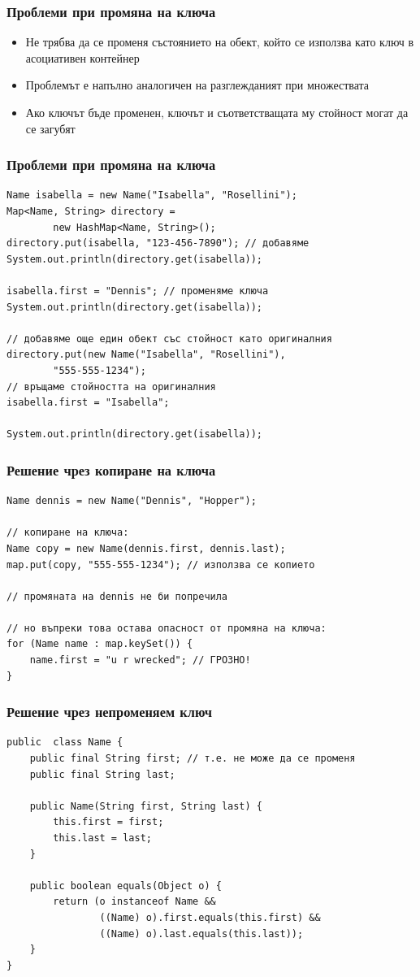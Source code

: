 \documentclass[ignorenonframetext, hyperref=unicode,compress]{beamer}
\begin{document}
\begin{frame}[containsverbatim]\frametitle{Проблеми при промяна на ключа}
\begin{itemize}
\item Не трябва да се променя състоянието на обект, който се използва като ключ в асоциативен контейнер
\item Проблемът е напълно аналогичен на разглежданият при множествата
\item Ако ключът бъде променен, ключът и съответстващата му стойност могат да се загубят
\end{itemize}
\end{frame}

\begin{frame}[containsverbatim]\frametitle{Проблеми при промяна на ключа}
\begin{lstlisting}
Name isabella = new Name("Isabella", "Rosellini");
Map<Name, String> directory = 
		new HashMap<Name, String>();
directory.put(isabella, "123-456-7890"); // добавяме
System.out.println(directory.get(isabella));

isabella.first = "Dennis"; // променяме ключа
System.out.println(directory.get(isabella));

// добавяме още един обект със стойност като оригиналния
directory.put(new Name("Isabella", "Rosellini"), 
		"555-555-1234");
// връщаме стойността на оригиналния
isabella.first = "Isabella"; 

System.out.println(directory.get(isabella));
\end{lstlisting}
\end{frame}

\begin{frame}[containsverbatim]\frametitle{Решение чрез копиране на ключа}
\begin{lstlisting}
Name dennis = new Name("Dennis", "Hopper");

// копиране на ключа:
Name copy = new Name(dennis.first, dennis.last);
map.put(copy, "555-555-1234"); // използва се копието

// промяната на dennis не би попречила

// но въпреки това остава опасност от промяна на ключа:
for (Name name : map.keySet()) {
	name.first = "u r wrecked"; // ГРОЗНО!
}
\end{lstlisting}
\end{frame}

\begin{frame}[containsverbatim]\frametitle{Решение чрез непроменяем ключ}
\begin{lstlisting}
public  class Name {
 	public final String first; // т.е. не може да се променя
 	public final String last;

 	public Name(String first, String last) {
 		this.first = first;
 		this.last = last;
	}

 	public boolean equals(Object o) {
 		return (o instanceof Name &&
 				((Name) o).first.equals(this.first) &&
 				((Name) o).last.equals(this.last));
	}
}
\end{lstlisting}
\end{frame}
\end{document}

